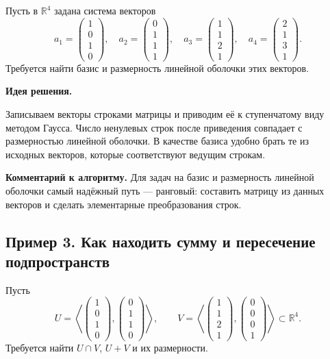 Пусть в $\mathbb R^4$ задана система векторов
\[
a_1=
\begin{pmatrix}
1\\0\\1\\0
\end{pmatrix},
\quad
a_2=
\begin{pmatrix}
0\\1\\1\\1
\end{pmatrix},
\quad
a_3=
\begin{pmatrix}
1\\1\\2\\1
\end{pmatrix},
\quad
a_4=
\begin{pmatrix}
2\\1\\3\\1
\end{pmatrix}.
\]
Требуется найти базис и размерность линейной оболочки этих векторов.

\textbf{Идея решения.}

Записываем векторы строками матрицы и приводим её к ступенчатому виду методом Гаусса. Число ненулевых строк после приведения совпадает с размерностью линейной оболочки. В качестве базиса удобно брать те из исходных векторов, которые соответствуют ведущим строкам.

\medskip
\noindent
\textbf{Комментарий к алгоритму.}
Для задач на базис и размерность линейной оболочки самый надёжный путь — ранговый: составить матрицу из данных векторов и сделать элементарные преобразования строк.

\subsection*{Пример 3. Как находить сумму и пересечение подпространств}

Пусть
\[
U=
\left\langle
\begin{pmatrix}
1\\0\\1\\0
\end{pmatrix},
\begin{pmatrix}
0\\1\\1\\0
\end{pmatrix}
\right\rangle,
\qquad
V=
\left\langle
\begin{pmatrix}
1\\1\\2\\1
\end{pmatrix},
\begin{pmatrix}
0\\0\\0\\1
\end{pmatrix}
\right\rangle
\subset \mathbb R^4.
\]
Требуется найти $U\cap V$, $U+V$ и их размерности.


